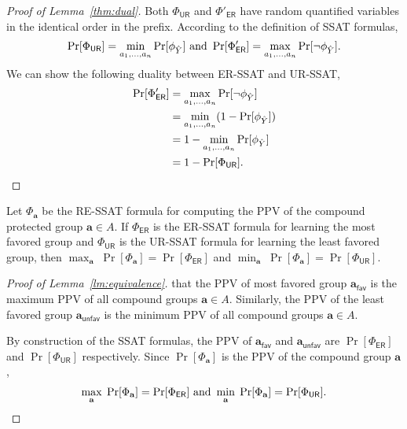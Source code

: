 \begin{proof}[Proof of Lemma~\ref{thm:dual}]
	Both $ \Phi_{\mathsf{UR}} $ and $ \Phi'_{\mathsf{ER}} $ have  random quantified variables in the identical order in the prefix. According to the definition of SSAT formulas,
\begin{equation}
\Pr[\Phi_{\mathsf{UR}}] = \min\limits_{a_1, \dots,a_n} \Pr[\phi_{\hat{Y}}] \text{ and } \Pr[\Phi'_{\mathsf{ER}}] = \max\limits_{a_1, \dots,a_n} \Pr[\neg\phi_{\hat{Y}}].\notag
\end{equation}
We can show the following duality between ER-SSAT and UR-SSAT,
\begin{equation}
\begin{split}
\Pr[\Phi'_{\mathsf{ER}}] &= \max\limits_{a_1, \dots,a_n} \Pr[\neg\phi_{\hat{Y}}]  \\
&= \min\limits_{a_1, \dots,a_n} (1 - \Pr[\phi_{\hat{Y}}])\\
&= 1 - \min\limits_{a_1, \dots,a_n}  \Pr[\phi_{\hat{Y}}]\\
&= 1 - \Pr[\Phi_{\mathsf{UR}}].\notag
\end{split}
\end{equation}
\end{proof}


\begin{lemma}
	\label{lm:equivalence}
	Let $ \Phi_{\mathbf{a}} $ be the RE-SSAT formula for computing the PPV of the compound protected group $ \mathbf{a} \in A $. If $ \Phi_{\mathsf{ER}} $ is the ER-SSAT formula for learning the most favored group and $ \Phi_{\mathsf{UR}} $ is the UR-SSAT formula for learning the least favored group, then
	$\max_{\mathbf{a}} \; \Pr[\Phi_{\mathbf{a}}] = \Pr[\Phi_{\mathsf{ER}}]$   
	and
	$\min_{\mathbf{a}} \; \Pr[\Phi_{\mathbf{a}}] = \Pr[\Phi_{\mathsf{UR}}]$.   
\end{lemma}

\begin{proof}[Proof of Lemma~\ref{lm:equivalence}] 
	 that the PPV of most favored group $ \mathbf{a}_{\mathsf{fav}} $ is the maximum PPV of all compound groups $ \mathbf{a} \in A $. Similarly, the PPV of the least favored group $ \mathbf{a}_{\mathsf{unfav}} $ is the minimum PPV of all compound groups $ \mathbf{a} \in A $.
	
	By construction of the SSAT formulas, the PPV of $ \mathbf{a}_{\mathsf{fav}} $ and $ \mathbf{a}_{\mathsf{unfav}} $ are $ \Pr[\Phi_{\mathsf{ER}}] $ and $ \Pr[\Phi_{\mathsf{UR}}] $ respectively. Since $ \Pr[\Phi_{\mathbf{a}}] $ is the PPV of the compound group $ \mathbf{a} $, 
	\begin{equation}
	\begin{split}
		\max_{\mathbf{a}} \; \Pr[\Phi_{\mathbf{a}}] = \Pr[\Phi_{\mathsf{ER}}]
	\text{ and }
	\min_{\mathbf{a}} \; \Pr[\Phi_{\mathbf{a}}] = \Pr[\Phi_{\mathsf{UR}}].\notag
	\end{split}
	\end{equation}
\end{proof}


